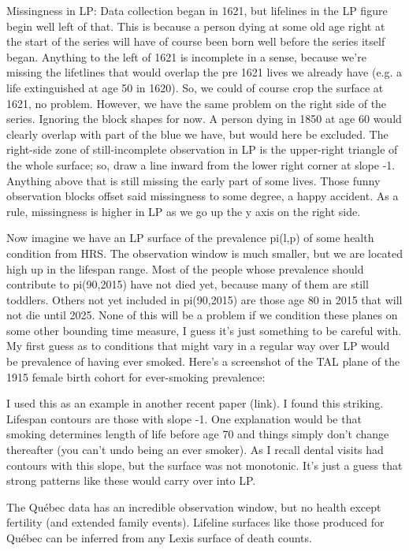 \begin{small}
Missingness in LP:
Data collection began in 1621, but lifelines in the LP figure begin well left of that. This is because a person dying at some old age right at the start of the series will have of course been born well before the series itself began. Anything to the left of 1621 is incomplete in a sense, because we're missing the lifetlines that would overlap the pre 1621 lives we already have (e.g. a life extinguished at age 50 in 1620). So, we could of course crop the surface at 1621, no problem. However, we have the same problem on the right side of the series. Ignoring the block shapes for now.  A person dying in 1850 at age 60 would clearly overlap with part of the blue we have, but would here be excluded. The right-side zone of still-incomplete observation in LP is the upper-right triangle of the whole surface; so, draw a line inward from the lower right corner at slope -1. Anything above that is still missing the early part of some lives. Those funny observation blocks offset said missingness to some degree, a happy accident. As a rule, missingness is higher in LP as we go up the y axis on the right side.

Now imagine we have an LP surface of the prevalence pi(l,p) of some health condition from HRS. The observation window is much smaller, but we are located high up in the lifespan range. Most of the people whose prevalence should contribute to  pi(90,2015) have not died yet, because many of them are still toddlers. Others not yet included in  pi(90,2015) are those age 80 in 2015 that will not die until 2025. None of this will be a problem if we condition these planes on some other bounding time measure, I guess it's just something to be careful with. My first guess as to conditions that might vary in a regular way over LP would be prevalence of having ever smoked. Here's a screenshot of the TAL plane of the 1915 female birth cohort for ever-smoking prevalence:

I used this as an example in another recent paper (link). I found this striking. Lifespan contours are those with slope -1. One explanation would be that smoking determines length of life before age 70 and things simply don't change thereafter (you can't undo being an ever smoker). As I recall dental visits had contours with this slope, but the surface was not monotonic. It's just a guess that strong patterns like these would carry over into LP.

The Qu\'{e}bec data has an incredible observation window, but no health except fertility (and extended family events). Lifeline surfaces like those produced for Qu\'{e}bec can be inferred from any Lexis surface of death counts.
\end{small}

